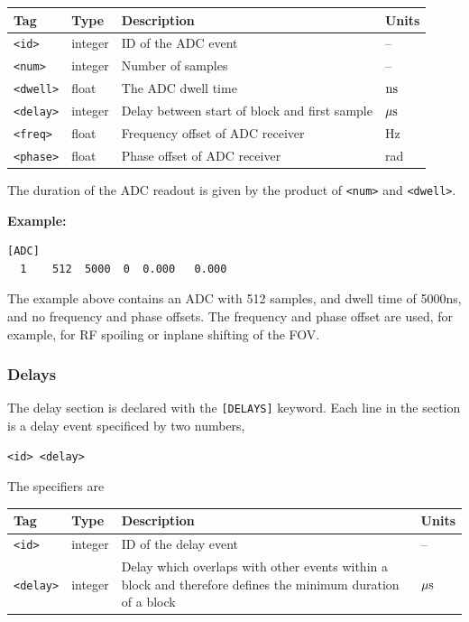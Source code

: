 \documentclass{article}
\begin{document}
\begin{tabularx}{\textwidth}{llXl}
\toprule
Tag & Type & Description & Units\\
\midrule
\verb.<id>. & integer & ID of the ADC event & -- \\
\verb.<num>. & integer & Number of samples & -- \\
\verb.<dwell>. & float & The ADC dwell time & $\rm n s$ \\
\verb.<delay>. & integer & Delay between start of block and first sample & $\rm \mu s$  \\
\verb.<freq>. & float & Frequency offset of ADC receiver & Hz \\
\verb.<phase>. & float & Phase offset of ADC receiver & rad \\
\bottomrule
\end{tabularx}

The duration of the ADC readout is given by the product of \verb.<num>. and \verb.<dwell>..

\begin{minipage}{\textwidth}
\textbf{Example:}
\begin{lstlisting}
[ADC]
  1    512  5000  0  0.000   0.000
\end{lstlisting}
\end{minipage}

The example above contains an ADC with 512 samples, and dwell time of 5000ns, and no frequency and phase offsets. The frequency and phase offset are used, for example, for RF spoiling or inplane shifting of the FOV.

\subsubsection{Delays}
The delay section is declared with the \verb.[DELAYS]. keyword. Each line in the section is a delay event specificed by two numbers,

\begin{lstlisting}
<id> <delay>
\end{lstlisting}

The specifiers are

\begin{tabularx}{\textwidth}{llXl}
\toprule
Tag & Type & Description & Units\\
\midrule
\verb.<id>. & integer & ID of the delay event & -- \\
\verb.<delay>. & integer & Delay which overlaps with other events within a block and therefore defines the minimum duration of a block & $\rm \mu s$ \\
\bottomrule
\end{tabularx}
\end{document}
